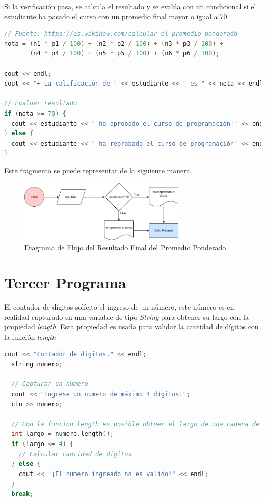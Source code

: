 \documentclass{article}
\begin{document}
Si la verificación pasa, se calcula el resultado y se evalúa con un condicional si el estudiante ha pasado el curso con un promedio final mayor o igual a 70.

\begin{lstlisting}[style=mystyle, language=c++]
// Fuente: https://es.wikihow.com/calcular-el-promedio-ponderado
nota = (n1 * p1 / 100) + (n2 * p2 / 100) + (n3 * p3 / 100) +
       (n4 * p4 / 100) + (n5 * p5 / 100) + (n6 * p6 / 100);

cout << endl;
cout << "+ La calificación de " << estudiante << " es " << nota << endl;

// Evaluar resultado
if (nota >= 70) {
  cout << estudiante << " ha aprobado el curso de programación!" << endl;
} else {
  cout << estudiante << " ha reprobado el curso de programación" << endl;
}
\end{lstlisting}

Este fragmento se puede representar de la siguiente manera.

\begin{figure}[H]
    \centering
    \includegraphics[width=8cm]{promedio_ponderado_salida}
    \caption{Diagrama de Flujo del Resultado Final del Promedio Ponderado}
\end{figure}

\section{Tercer Programa}

El contador de dígitos solícito el ingreso de un número, este número es en realidad capturado en una variable de tipo \emph{String} para obtener su largo con la propiedad \emph{length}. Esta propiedad es usada para validar la cantidad de dígitos con la función \emph{length}

\begin{lstlisting}[style=mystyle, language=c++]
  cout << "Contador de dígitos." << endl;
  string numero;

  // Capturar un número
  cout << "Ingrese un numero de máximo 4 dígitos:";
  cin >> numero;

  // Con la funcion length es posible obtner el largo de una cadena de text
  int largo = numero.length();
  if (largo <= 4) {
    // Calcular cantidad de dígitos
  } else {
    cout << "¡El numero ingreado no es valido!" << endl;
  }
  break;
\end{lstlisting}
\end{document}
